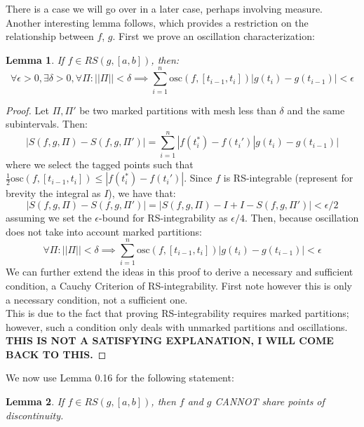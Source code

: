 \documentclass[10pt,letterpaper]{article} %
\newtheorem{lem}{Lemma}[section]
\begin{document}
There is a case we will go over in a later case, perhaps involving measure. Another interesting lemma follows, which provides a restriction on the relationship between $f$, $g$. First we prove an oscillation characterization:
\begin{lem}
If $f \in RS(g, [a, b])$, then:
\begin{equation*}
  \forall \epsilon > 0, \exists \delta > 0, \forall \Pi: ||\Pi|| < \delta \implies \sum_{i=1}^{n}\text{osc}(f, [t_{i-1}, t_i])|g(t_i) - g(t_{i-1})| < \epsilon
\end{equation*}
\end{lem}
\begin{proof}
Let $\Pi, \Pi'$ be two marked partitions with mesh less than $\delta$ and the same subintervals. Then:
\begin{equation*}
  |S(f, g, \Pi) - S(f, g, \Pi')| = \sum_{i=1}^{n}|f(t_i^*) - f(t_i')|g(t_i) - g(t_{i-1})|
\end{equation*}
where we select the tagged points such that $\frac{1}{2}\text{osc}(f, [t_{i-1}, t_i]) \leqslant |f(t_i^*) - f(t_i')|$. Since $f$ is RS-integrable (represent for brevity the integral as $I$), we have that:
\begin{equation*}
  |S(f, g, \Pi) - S(f, g, \Pi')| = |S(f, g, \Pi) - I + I - S(f, g, \Pi')| < \epsilon/2
\end{equation*}
assuming we set the $\epsilon$-bound for RS-integrability as $\epsilon/4$. Then, because oscillation does not take into account marked partitions:
\begin{equation*}
  \forall \Pi: ||\Pi|| < \delta \implies \sum_{i=1}^{n}\text{osc}(f, [t_{i-1}, t_i])|g(t_i) - g(t_{i-1})| < \epsilon
\end{equation*}
We can further extend the ideas in this proof to derive a necessary and sufficient condition, a Cauchy Criterion of RS-integrability. First note however this is only a necessary condition, not a sufficient one.\\

This is due to the fact that proving RS-integrability requires marked partitions; however, such a condition only deals with unmarked partitions and oscillations. \textbf{THIS IS NOT A SATISFYING EXPLANATION, I WILL COME BACK TO THIS.}
\end{proof}
We now use Lemma 0.16 for the following statement:
\begin{lem}
If $f \in RS(g, [a, b])$, then $f$ and $g$ CANNOT share points of discontinuity.
\end{lem}
\end{document}
